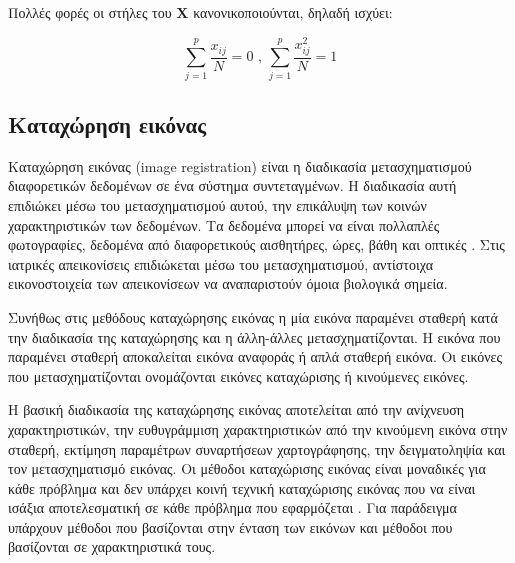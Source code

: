 \documentclass[a4paper,12pt]{article}
\begin{document}
Πολλές φορές οι στήλες του $\bm{X}$ κανονικοποιούνται, δηλαδή ισχύει:

\begin{equation*}
    \sum_{j=1}^{p} {\frac{x_{ij}}{N}} = 0
    \text{ , }
    \sum_{j=1}^{p} {\frac{x_{ij}^2}{N}} = 1
\end{equation*}

\subsection{Καταχώρηση εικόνας} \label{registration:1}

Καταχώρηση εικόνας (image registration) είναι η διαδικασία μετασχηματισμού
διαφορετικών δεδομένων σε ένα σύστημα συντεταγμένων. Η διαδικασία αυτή επιδιώκει
μέσω του μετασχηματισμού αυτού, την επικάλυψη των κοινών χαρακτηριστικών των
δεδομένων. Τα δεδομένα μπορεί να είναι πολλαπλές φωτογραφίες, δεδομένα από
διαφορετικούς αισθητήρες, ώρες, βάθη και οπτικές \cite{Registration:1}. Στις
ιατρικές απεικονίσεις επιδιώκεται μέσω του μετασχηματισμού, αντίστοιχα
εικονοστοιχεία των απεικονίσεων να αναπαριστούν όμοια βιολογικά σημεία.

Συνήθως στις μεθόδους καταχώρησης εικόνας η μία εικόνα παραμένει σταθερή κατά
την διαδικασία της καταχώρησης και η άλλη-άλλες μετασχηματίζονται. Η εικόνα που
παραμένει σταθερή αποκαλείται εικόνα αναφοράς ή απλά σταθερή εικόνα. Οι εικόνες
που μετασχηματίζονται ονομάζονται εικόνες καταχώρισης ή κινούμενες εικόνες.


Η βασική διαδικασία της καταχώρησης εικόνας αποτελείται από την ανίχνευση
χαρακτηριστικών, την ευθυγράμμιση χαρακτηριστικών από την κινούμενη εικόνα στην
σταθερή, εκτίμηση παραμέτρων συναρτήσεων χαρτογράφησης, την δειγματοληψία και
τον μετασχηματισμό εικόνας. Οι μέθοδοι καταχώρισης εικόνας είναι μοναδικές για
κάθε πρόβλημα και δεν υπάρχει κοινή τεχνική καταχώρισης εικόνας που να είναι
ισάξια αποτελεσματική σε κάθε πρόβλημα που εφαρμόζεται \cite{Registration:2}.
Για παράδειγμα υπάρχουν μέθοδοι που βασίζονται στην ένταση των εικόνων και
μέθοδοι που βασίζονται σε χαρακτηριστικά τους.

\end{document}
